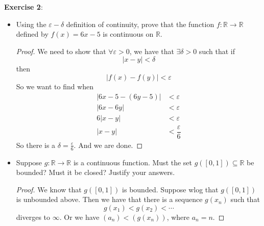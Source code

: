 \documentclass{article}
\begin{document}
\textbf{Exercise 2}: \begin{itemize}
    \item Using the $\varepsilon - \delta$ definition of continuity, prove that the function $f: \mathbb{R} \rightarrow\mathbb{R}$ defined by $f(x) = 6x - 5$ is continuous on $\mathbb{R}$.
        \begin{proof}
            We need to show that $\forall \varepsilon >0$, we have that $\exists \delta >0$ such that if 
                \begin{equation*}
                    \lvert x - y \rvert < \delta
                \end{equation*}
            then
                \begin{equation*}
                    \lvert f(x) - f(y) \rvert < \varepsilon
                \end{equation*}
            So we want to find when
                \begin{align*}
                    \lvert 6x - 5 - (6y - 5) \rvert &< \varepsilon            \\
                    \lvert 6x - 6y \rvert           &< \varepsilon            \\
                    6\lvert x - y \rvert            &< \varepsilon            \\
                    \lvert x - y \rvert             &< \dfrac{\varepsilon}{6}   
                \end{align*}
            So there is a $\delta = \frac{\varepsilon}{6}$. And we are done.
        \end{proof}

    \item Suppose $g : \mathbb{R} \rightarrow \mathbb{R}$ is a continuous function. Must the set $g([0 , 1]) \subseteq\mathbb{R}$ be bounded? Must it be closed? Justify your answers.
        \begin{proof}
            We know that $g([0, 1])$ is bounded. Suppose wlog that $g([0, 1])$ is unbounded above. Then we have that there is a sequence $g(x_{n})$ such that 
                \begin{equation*}
                    g(x_{1}) < g(x_{2}) < \cdots
                \end{equation*}
            diverges to $\infty$. Or we have $(a_{n}) < (g(x_{n}))$, where $a_{n} = n$.
        \end{proof}
\end{itemize}
\end{document}
